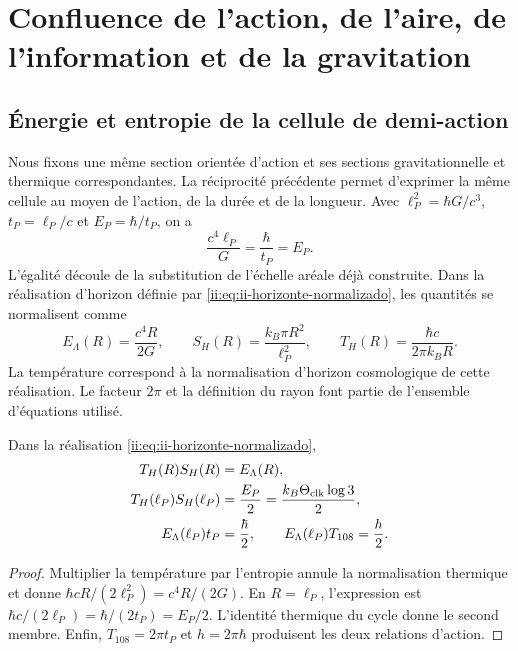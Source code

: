 \section{Confluence de l’action, de l’aire, de l’information et de la gravitation}
\label{ii:sec:confluencia}

\subsection{Énergie et entropie de la cellule de demi-action}

Nous fixons une même section orientée d’action et ses sections
gravitationnelle et thermique correspondantes. La réciprocité précédente permet d’exprimer la même cellule au moyen de
l’action, de la durée et de la longueur. Avec
\(\ell_P^2=\hbar G/c^3\), \(t_P=\ell_P/c\) et
\(E_P=\hbar/t_P\), on a
\[
 \frac{c^4\ell_P}{G}=\frac{\hbar}{t_P}=E_P.
\]
L’égalité découle de la substitution de l’échelle aréale déjà construite. Dans la
réalisation d’horizon définie par \eqref{ii:eq:ii-horizonte-normalizado}, les quantités
se normalisent comme
\begin{equation}
 E_\Lambda(R)=\frac{c^4R}{2G},\qquad
 S_H(R)=\frac{k_B\pi R^2}{\ell_P^2},\qquad
 T_H(R)=\frac{\hbar c}{2\pi k_BR}.
 \label{ii:eq:ii-horizonte-normalizado}
\end{equation}
La température correspond à la normalisation d’horizon cosmologique
de cette réalisation. Le facteur \(2\pi\) et la définition du rayon
font partie de l’ensemble d’équations utilisé.

\begin{theorem}
Dans la réalisation \eqref{ii:eq:ii-horizonte-normalizado},
\begin{align}
 T_H(R)S_H(R)&=E_\Lambda(R),\\
 T_H(\ell_P)S_H(\ell_P)&=\frac{E_P}{2}
 =\frac{k_B\Theta_{\rm clk}\log3}{2},\\
 E_\Lambda(\ell_P)t_P&=\frac{\hbar}{2},\qquad
 E_\Lambda(\ell_P)T_{108}=\frac h2.
\end{align}
\end{theorem}
\begin{proof}
Multiplier la température par l’entropie annule la normalisation
thermique et donne \(\hbar cR/(2\ell_P^2)=c^4R/(2G)\).
En \(R=\ell_P\), l’expression est \(\hbar c/(2\ell_P)
=\hbar/(2t_P)=E_P/2\). L’identité thermique du cycle donne
le second membre. Enfin, \(T_{108}=2\pi t_P\) et
\(h=2\pi\hbar\) produisent les deux relations d’action.
\end{proof}

